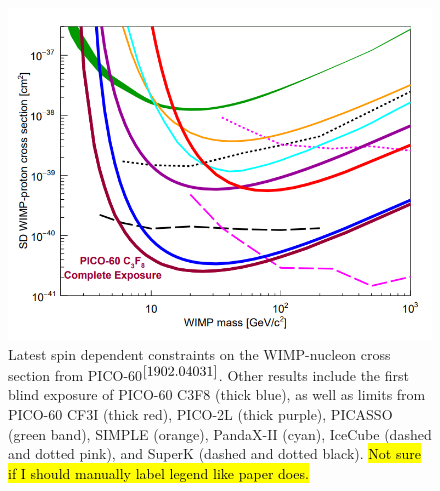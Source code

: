 \documentclass[%
12pt,
twoside,
reprint,
amsmath,amssymb,
aps,
]{article}
\begin{document}
	\begin{figure}
		\includegraphics[scale = 0.4, center]{Images/constraints.png}
		\caption{\label{tab:table-name} Latest spin dependent constraints on the WIMP-nucleon cross section from PICO-60$^{\cite{1902.04031}}$. Other results include the first blind exposure of PICO-60 C3F8 (thick blue), as well as limits from PICO-60 CF3I (thick red), PICO-2L (thick purple), PICASSO (green band), SIMPLE (orange), PandaX-II (cyan), IceCube (dashed and dotted pink), and SuperK (dashed and dotted black). \hl{Not sure if I should manually label legend like paper does.}}
	\end{figure}
	
\end{document}
